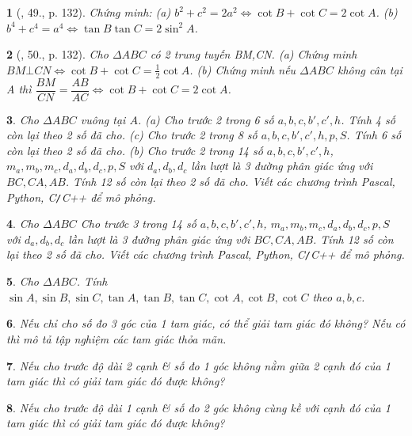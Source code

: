 \documentclass{article}
\newtheorem{baitoan}{}
\begin{document}
\begin{baitoan}[\cite{TLCT_hinh_hoc_10}, 49., p. 132]
	Chứng minh: (a) $b^2 + c^2 = 2a^2\Leftrightarrow\cot B + \cot C = 2\cot A$. (b) $b^4 + c^4 = a^4\Leftrightarrow\tan B\tan C = 2\sin^2A$.
\end{baitoan}

\begin{baitoan}[\cite{TLCT_hinh_hoc_10}, 50., p. 132]
	Cho $\Delta ABC$ có 2 trung tuyến BM,CN. (a) Chứng minh $BM\bot CN\Leftrightarrow\cot B + \cot C = \frac{1}{2}\cot A$. (b) Chứng minh nếu $\Delta ABC$ không cân tại A thì $\dfrac{BM}{CN} = \dfrac{AB}{AC}\Leftrightarrow\cot B + \cot C = 2\cot A$.
\end{baitoan}

\begin{baitoan}
	Cho $\Delta ABC$ vuông tại $A$. (a) Cho trước 2 trong 6 số $a,b,c,b',c',h$. Tính 4 số còn lại theo 2 số đã cho. (c) Cho trước 2 trong 8 số $a,b,c,b',c',h,p,S$. Tính 6 số còn lại theo 2 số đã cho. (b) Cho trước 2 trong 14 số $a,b,c,b',c',h$, $m_a,m_b,m_c,d_a,d_b,d_c,p,S$ với $d_a,d_b,d_c$ lần lượt là 3 đường phân giác ứng với $BC,CA,AB$. Tính 12 số còn lại theo 2 số đã cho. Viết các chương trình {\sf Pascal, Python, C{\tt/}C++} để mô phỏng.
\end{baitoan}

\begin{baitoan}
	Cho $\Delta ABC$ Cho trước 3 trong 14 số $a,b,c,b',c',h$, $m_a,m_b,m_c,d_a,d_b,d_c,p,S$ với $d_a,d_b,d_c$ lần lượt là 3 đường phân giác ứng với $BC,CA,AB$. Tính 12 số còn lại theo 2 số đã cho. Viết các chương trình {\sf Pascal, Python, C{\tt/}C++} để mô phỏng.
\end{baitoan}

\begin{baitoan}
	Cho $\Delta ABC$. Tính $\sin A,\sin B,\sin C,\tan A,\tan B,\tan C,\cot A,\cot B,\cot C$ theo $a,b,c$.
\end{baitoan}

\begin{baitoan}
	Nếu chỉ cho số đo 3 góc của 1 tam giác, có thể giải tam giác đó không? Nếu có thì mô tả tập nghiệm các tam giác thỏa mãn.
\end{baitoan}

\begin{baitoan}
	Nếu cho trước độ dài 2 cạnh \& số đo 1 góc không nằm giữa 2 cạnh đó của 1 tam giác thì có giải tam giác đó được không?
\end{baitoan}

\begin{baitoan}
	Nếu cho trước độ dài 1 cạnh \& số đo 2 góc không cùng kề với cạnh đó của 1 tam giác thì có giải tam giác đó được không?
\end{baitoan}
\end{document}

